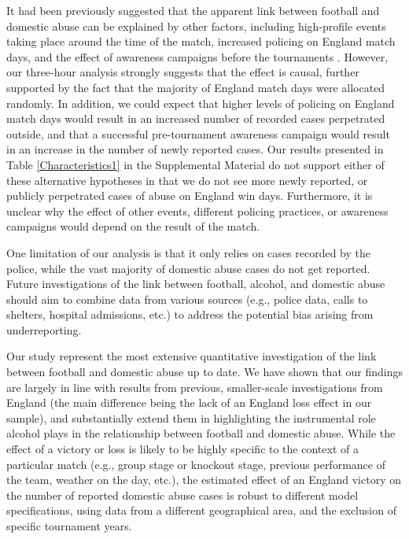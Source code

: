\documentclass[12pt, a4paper]{article}
\begin{document}
It had been previously suggested that the apparent link between football and domestic abuse can be explained by other factors, including high-profile events taking place around the time of the match, increased policing on England match days, and the effect of awareness campaigns before the tournaments \cite{Brooks-Hay2018}. However, our three-hour analysis strongly suggests that the effect is causal, further supported by the fact that the majority of England match days were allocated randomly. In addition, we could expect that higher levels of policing on England match days would result in an increased number of recorded cases perpetrated outside, and that a successful pre-tournament awareness campaign would result in an increase in the number of newly reported cases. Our results presented in Table \ref{Characteristics1} in the Supplemental Material do not support either of these alternative hypotheses in that we do not see more newly reported, or publicly perpetrated cases of abuse on England win days. Furthermore, it is unclear why the effect of other events, different policing practices, or awareness campaigns would depend on the result of the match. 

One limitation of our analysis is that it only relies on cases recorded by the police, while the vast majority of domestic abuse cases do not get reported. Future investigations of the link between football, alcohol, and domestic abuse should aim to combine data from various sources (e.g., police data, calls to shelters, hospital admissions, etc.) to address the potential bias arising from underreporting. 





 Our study represent the most extensive quantitative investigation of the link between football and domestic abuse up to date. We have shown that our findings are largely in line with results from previous, smaller-scale investigations from England (the main difference being the lack of an England loss effect in our sample), and substantially extend them in highlighting the instrumental role alcohol plays in the relationship between football and domestic abuse. While the effect of a victory or loss is likely to be highly specific to the context of a particular match (e.g., group stage or knockout stage, previous performance of the team, weather on the day, etc.), the estimated effect of an England victory on the number of reported domestic abuse cases is robust to different model specifications, using data from a different geographical area, and the exclusion of specific tournament years. 
\end{document}
